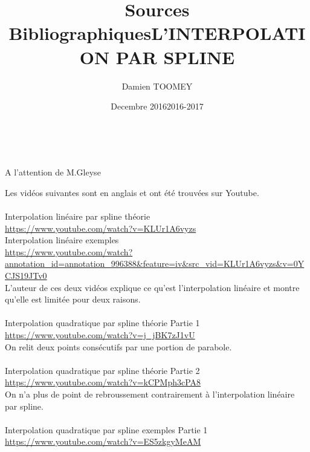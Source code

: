 \documentclass{article}
\title{Sources Bibliographiques}
\author{Damien TOOMEY}
\date{Decembre 2016}
\begin{document}
\maketitle

\vspace{10\baselineskip}
\begin{center}
\makeatother
\title{L'INTERPOLATION PAR SPLINE}\\
\end{center}

\vspace{12\baselineskip}
\begin{center}
A l'attention de M.Gleyse\\
\date{2016-2017}
\end{center}

\newpage
\begingroup\raggedleft
Les vid\'{e}os suivantes sont en anglais et ont \'{e}t\'{e} trouv\'{e}es sur Youtube.
\endgroup
\\\\
Interpolation lin\'{e}aire par spline th\'{e}orie
\\
{\color{blue}
\url{https://www.youtube.com/watch?v=KLUr1A6vyzs}}
\\
Interpolation lin\'{e}aire exemples
\\
{\color{blue}
\url{https://www.youtube.com/watch?annotation_id=annotation_996388&feature=iv&src_vid=KLUr1A6vyzs&v=0YCJS19JTv0}}
\\ 
L'auteur de ces deux vid\'{e}os explique ce qu'est l'interpolation lin\'{e}aire et montre qu'elle est limit\'{e}e pour deux raisons.
\\\\
Interpolation quadratique par spline th\'{e}orie Partie 1
\\
{\color{blue}
\url{https://www.youtube.com/watch?v=j_jBK7zJ1vU}}
\\ 
On relit deux points cons\'{e}cutifs par une portion de parabole.
\\\\
Interpolation quadratique par spline th\'{e}orie Partie 2
\\
{\color{blue}
\url{https://www.youtube.com/watch?v=kCPMph3cPA8}}
\\
On n'a plus de point de rebroussement contrairement \`{a} l'interpolation lin\'{e}aire par spline. 
\\\\
Interpolation quadratique par spline exemples Partie 1
\\
{\color{blue}
\url{https://www.youtube.com/watch?v=ES5zkgyMeAM}}
\end{document}

